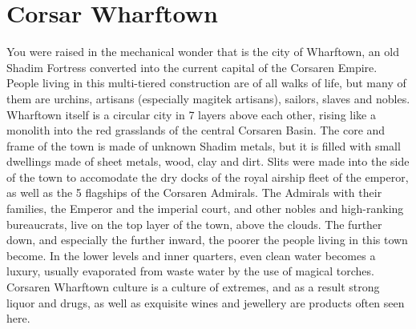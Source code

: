 \section{Corsar Wharftown}\label{culture:corsWharftown}
You were raised in the mechanical wonder that is the city of Wharftown, an old Shadim Fortress converted into the current capital of the Corsaren Empire.
People living in this multi-tiered construction are of all walks of life, but many of them are urchins, artisans (especially magitek artisans), sailors, slaves and nobles.
Wharftown itself is a circular city in 7 layers above each other, rising like a monolith into the red grasslands of the central Corsaren Basin.
The core and frame of the town is made of unknown Shadim metals, but it is filled with small dwellings made of sheet metals, wood, clay and dirt.
Slits were made into the side of the town to accomodate the dry docks of the royal airship fleet of the emperor, as well as the 5 flagships of the Corsaren Admirals.
The Admirals with their families, the Emperor and the imperial court, and other nobles and high-ranking bureaucrats, live on the top layer of the town, above the clouds.
The further down, and especially the further inward, the poorer the people living in this town become.
In the lower levels and inner quarters, even clean water becomes a luxury, usually evaporated from waste water by the use of magical torches.
Corsaren Wharftown culture is a culture of extremes, and as a result strong liquor and drugs, as well as exquisite wines and jewellery are products often seen here.